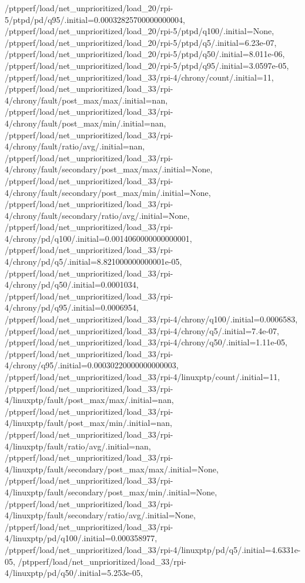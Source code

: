 {    /ptpperf/load/net_unprioritized/load_20/rpi-5/ptpd/pd/q95/.initial=0.00032825700000000004,
    /ptpperf/load/net_unprioritized/load_20/rpi-5/ptpd/q100/.initial=None,
    /ptpperf/load/net_unprioritized/load_20/rpi-5/ptpd/q5/.initial=6.23e-07,
    /ptpperf/load/net_unprioritized/load_20/rpi-5/ptpd/q50/.initial=8.011e-06,
    /ptpperf/load/net_unprioritized/load_20/rpi-5/ptpd/q95/.initial=3.0597e-05,
    /ptpperf/load/net_unprioritized/load_33/rpi-4/chrony/count/.initial=11,
    /ptpperf/load/net_unprioritized/load_33/rpi-4/chrony/fault/post_max/max/.initial=nan,
    /ptpperf/load/net_unprioritized/load_33/rpi-4/chrony/fault/post_max/min/.initial=nan,
    /ptpperf/load/net_unprioritized/load_33/rpi-4/chrony/fault/ratio/avg/.initial=nan,
    /ptpperf/load/net_unprioritized/load_33/rpi-4/chrony/fault/secondary/post_max/max/.initial=None,
    /ptpperf/load/net_unprioritized/load_33/rpi-4/chrony/fault/secondary/post_max/min/.initial=None,
    /ptpperf/load/net_unprioritized/load_33/rpi-4/chrony/fault/secondary/ratio/avg/.initial=None,
    /ptpperf/load/net_unprioritized/load_33/rpi-4/chrony/pd/q100/.initial=0.0014060000000000001,
    /ptpperf/load/net_unprioritized/load_33/rpi-4/chrony/pd/q5/.initial=8.821000000000001e-05,
    /ptpperf/load/net_unprioritized/load_33/rpi-4/chrony/pd/q50/.initial=0.0001034,
    /ptpperf/load/net_unprioritized/load_33/rpi-4/chrony/pd/q95/.initial=0.0006954,
    /ptpperf/load/net_unprioritized/load_33/rpi-4/chrony/q100/.initial=0.0006583,
    /ptpperf/load/net_unprioritized/load_33/rpi-4/chrony/q5/.initial=7.4e-07,
    /ptpperf/load/net_unprioritized/load_33/rpi-4/chrony/q50/.initial=1.11e-05,
    /ptpperf/load/net_unprioritized/load_33/rpi-4/chrony/q95/.initial=0.00030220000000000003,
    /ptpperf/load/net_unprioritized/load_33/rpi-4/linuxptp/count/.initial=11,
    /ptpperf/load/net_unprioritized/load_33/rpi-4/linuxptp/fault/post_max/max/.initial=nan,
    /ptpperf/load/net_unprioritized/load_33/rpi-4/linuxptp/fault/post_max/min/.initial=nan,
    /ptpperf/load/net_unprioritized/load_33/rpi-4/linuxptp/fault/ratio/avg/.initial=nan,
    /ptpperf/load/net_unprioritized/load_33/rpi-4/linuxptp/fault/secondary/post_max/max/.initial=None,
    /ptpperf/load/net_unprioritized/load_33/rpi-4/linuxptp/fault/secondary/post_max/min/.initial=None,
    /ptpperf/load/net_unprioritized/load_33/rpi-4/linuxptp/fault/secondary/ratio/avg/.initial=None,
    /ptpperf/load/net_unprioritized/load_33/rpi-4/linuxptp/pd/q100/.initial=0.000358977,
    /ptpperf/load/net_unprioritized/load_33/rpi-4/linuxptp/pd/q5/.initial=4.6331e-05,
    /ptpperf/load/net_unprioritized/load_33/rpi-4/linuxptp/pd/q50/.initial=5.253e-05,
}
